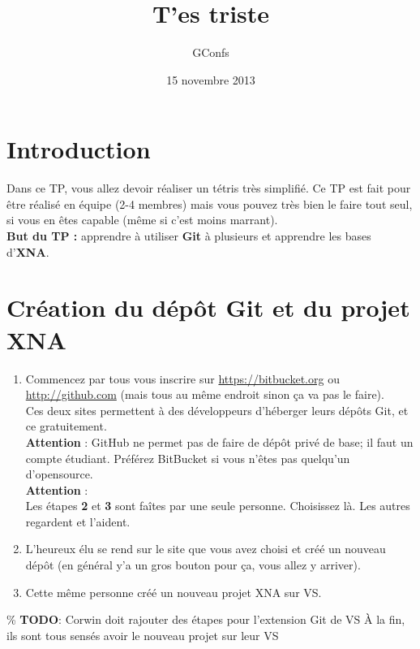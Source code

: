\documentclass[a4paper]{article}
\title{T'es triste}
\author{
    GConfs
}
\date{15 novembre 2013}
\begin{document}
\color{foreground}

%
\begin{center}
\end{center}

\section*{Introduction}

Dans ce TP, vous allez devoir réaliser un tétris très simplifié. Ce TP est fait
pour être réalisé en équipe (2-4 membres) mais vous pouvez très bien le faire
tout seul, si vous en êtes capable (même si c'est moins marrant). \\

\textbf{But du TP :} apprendre à utiliser \textbf{Git} à plusieurs et apprendre
les bases d'\textbf{XNA}.

\section{Création du dépôt Git et du projet XNA}


\begin{enumerate}
    \item Commencez par tous vous inscrire sur \url{https://bitbucket.org} ou
    \url{http://github.com} (mais tous au même endroit sinon ça va pas le faire). \\
    Ces deux sites permettent à des développeurs d'héberger leurs dépôts Git, et ce
    gratuitement.\\
    \textbf{Attention} : GitHub ne permet pas de faire de dépôt privé
    de base; il faut un compte étudiant. Préférez BitBucket si vous n'êtes pas
    quelqu'un d'opensource.\\

    {\color{red} \textbf{Attention} : \\Les étapes \textbf{2} et \textbf{3}
    sont faîtes par une seule personne. Choisissez là. Les autres regardent et
    l'aident.}\\

    \item L'heureux élu se rend sur le site que vous avez choisi et créé un
    nouveau dépôt (en général y'a un gros bouton pour ça, vous allez y arriver). \\

    \item Cette même personne créé un nouveau projet XNA sur VS.
\end{enumerate}

\% \textbf{TODO}: Corwin doit rajouter des étapes pour l'extension Git de VS
À la fin, ils sont tous sensés avoir le nouveau projet sur leur VS


%
\end{document}
